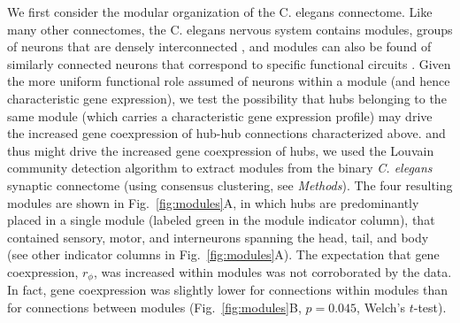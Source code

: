 \documentclass[10pt,letterpaper]{article}
\begin{document}
We first consider the modular organization of the C. elegans connectome.
Like many other connectomes, the C. elegans nervous system contains modules, groups of neurons that are densely interconnected \cite{Kim2014, Bassett2010}, and modules can also be found of similarly connected neurons that correspond to specific functional circuits \cite{Achacoso:1992ay, Pavlovic2014}.
Given the more uniform functional role assumed of neurons within a module (and hence characteristic gene expression), we test the possibility that hubs belonging to the same module (which carries a characteristic gene expression profile) may drive the increased gene coexpression of hub-hub connections characterized above.
 and thus might drive the increased gene coexpression of hubs, we used the Louvain community detection algorithm to extract modules from the binary \emph{C. elegans} synaptic connectome (using consensus clustering, see \textit{Methods}).
The four resulting modules are shown in Fig.~\ref{fig:modules}A, in which hubs are predominantly placed in a single module (labeled green in the module indicator column), that contained sensory, motor, and interneurons spanning the head, tail, and body (see other indicator columns in Fig.~\ref{fig:modules}A).
The expectation that gene coexpression, $r_\phi$, was increased within modules was not corroborated by the data.
In fact, gene coexpression was slightly lower for connections within modules than for connections between modules (Fig.~\ref{fig:modules}B, $p = 0.045$, Welch's $t$-test).
\end{document}
